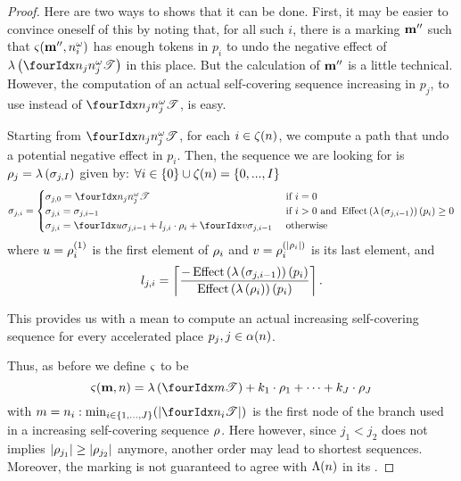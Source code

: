 \begin{proof}
  Here are two ways to shows that it can be done.
  First, it may be easier to convince oneself of this by noting that, for all such $i$, there is a marking $\mathbf{m}''$ such that $\operatorname{\varsigma}(\mathbf{m}'',n^\omega_i)$ has enough tokens in $p_i$ to undo the negative effect of $\labt{\treepath[n_j]{n^\omega_j}}$ in this place. But the calculation of $\mathbf{m}''$ is a little technical.\\
   However, the computation of an actual self-covering sequence increasing in $p_j$, to use instead of $\treepath[n_j]{ n^\omega_j}$, is easy.

   Starting from $\treepath[n_j]{n^\omega_j}$, for each $i \in \operatorname{\zeta}(n)$, we compute a path that undo a potential negative effect in $p_i$.
   Then, the sequence we are looking for is $\iscs{j} = \labt{\seqt_{j,I}}$ given by: $\forall i \in \{0\} \cup \operatorname{\zeta}(n) = \{0, ..., I\}$
  \[
    \seqt_{j,i} =
    \begin{cases}
      \seqt_{j,0} = \treepath[n_j]{n^\omega_j}
        &\text{ if } i = 0 \\
      \seqt_{j,i} = \seqt_{j,i-1}
        &\text{ if } i > 0 \text{ and } \effect{\labt{\seqt_{j,i-1}}}(p_i) \geq 0 \\
      \seqt_{j,i} = \slice[\seqt_{j,i-1}]{}{u} + l_{j,i} \cdot \iscs{i} + \slice[\seqt_{j,i-1}]{v}{}
        &\text{ otherwise}
    \end{cases}
  \]
  where $u = \elem{\iscs{i}}{1}$ is the first element of $\iscs{i}$ and $v = \elem{\iscs{i}}{\card{\iscs{i}}}$ is its last element,
  and
  \[
    l_{j,i} = 
    \left\lceil \frac{-\effect{\labt{\seqt_{j,i-1}}}(p_i)}
                     { \effect{\labt{\iscs{i}}}(p_i)} \right\rceil \text{.}
  \]

  This provides us with a mean to compute an actual increasing self-covering sequence for every accelerated place $p_j, j \in \operatorname{\alpha}(n)$.

  Thus, as before we define $\operatorname{\varsigma}$ to be
  \[ \tts{\mar}{n} = \labt{\treepath{m}} + k_1 \cdot \iscs{1} + \dots + k_J \cdot \iscs{J} \]
  with $m = n_i : \min_{i \in \range{1}{J}}(\card{\treepath{n_i}})$ is the first node of the branch used in a increasing self-covering sequence $\iscs{}$.
  Here however, since $j_1 < j_2$ does not implies $\card{\iscs{j_1}} \geq \card{\iscs{j_2}}$ anymore, another order may lead to shortest sequences.
  Moreover, the marking is not guaranteed to agree with $\operatorname{\Lambda}(n)$ in its \noplaces.




\end{proof}
